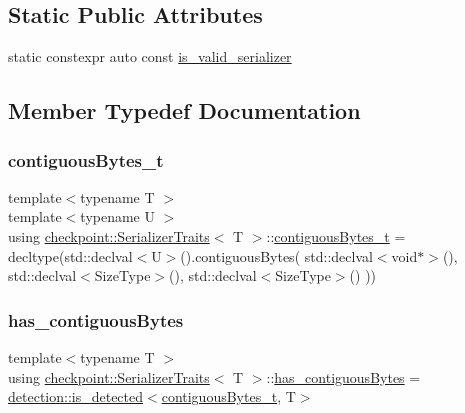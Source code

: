 \subsection*{Static Public Attributes}
\begin{DoxyCompactItemize}
\item 
static constexpr auto const \hyperlink{structcheckpoint_1_1_serializer_traits_a8818dc68069bcf67d4d2b43a9cd57026}{is\+\_\+valid\+\_\+serializer}
\end{DoxyCompactItemize}


\subsection{Member Typedef Documentation}
\mbox{\label{structcheckpoint_1_1_serializer_traits_aaa8510ef21bb5aac75f50f8038091b86}} 
\subsubsection{\texorpdfstring{contiguous\+Bytes\+\_\+t}{contiguousBytes\_t}}
{\footnotesize\ttfamily template$<$typename T $>$ \\
template$<$typename U $>$ \\
using \hyperlink{structcheckpoint_1_1_serializer_traits}{checkpoint\+::\+Serializer\+Traits}$<$ T $>$\+::\hyperlink{structcheckpoint_1_1_serializer_traits_aaa8510ef21bb5aac75f50f8038091b86}{contiguous\+Bytes\+\_\+t} =  decltype(std\+::declval$<$U$>$().contiguous\+Bytes( std\+::declval$<$void$\ast$$>$(), std\+::declval$<$Size\+Type$>$(), std\+::declval$<$Size\+Type$>$() ))}

\mbox{\label{structcheckpoint_1_1_serializer_traits_aee3349b1b0e4064b7f3a0baf29580835}} 
\subsubsection{\texorpdfstring{has\+\_\+contiguous\+Bytes}{has\_contiguousBytes}}
{\footnotesize\ttfamily template$<$typename T $>$ \\
using \hyperlink{structcheckpoint_1_1_serializer_traits}{checkpoint\+::\+Serializer\+Traits}$<$ T $>$\+::\hyperlink{structcheckpoint_1_1_serializer_traits_aee3349b1b0e4064b7f3a0baf29580835}{has\+\_\+contiguous\+Bytes} =  \hyperlink{namespacedetection_a30893549a3de1e9603d78dad6d5dce92}{detection\+::is\+\_\+detected}$<$\hyperlink{structcheckpoint_1_1_serializer_traits_aaa8510ef21bb5aac75f50f8038091b86}{contiguous\+Bytes\+\_\+t}, T$>$}

